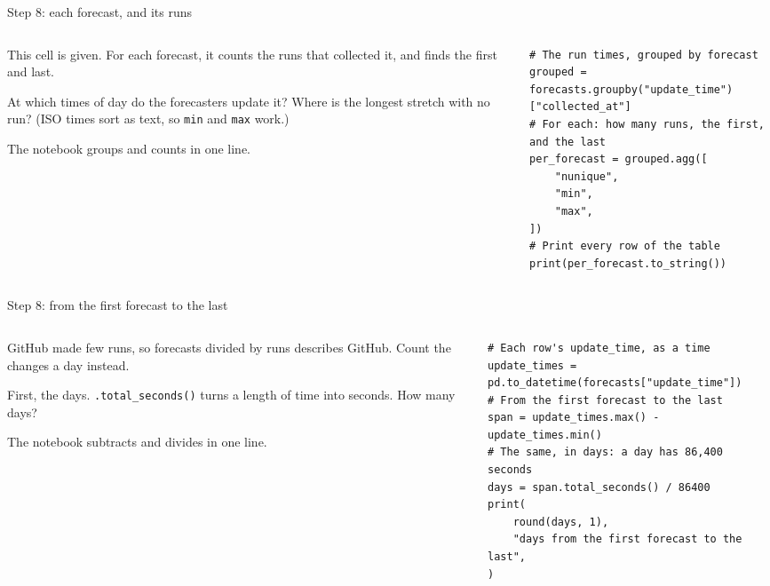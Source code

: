 \documentclass[9pt,aspectratio=169]{beamer}
\begin{document}
\begin{frame}[fragile]{Step 8: each forecast, and its runs}
    \begin{columns}[T]
        \begin{column}{0.37\textwidth}
            This cell is given. For each forecast, it counts the runs that collected it, and finds the first and last.

            \medskip
            At which times of day do the forecasters update it? Where is the longest stretch with no run? (ISO times sort as text, so \texttt{min} and \texttt{max} work.)

            \medskip
            The notebook groups and counts in one line.
        \end{column}
        \begin{column}{0.6\textwidth}
\begin{lstlisting}
# The run times, grouped by forecast
grouped = forecasts.groupby("update_time")["collected_at"]
# For each: how many runs, the first, and the last
per_forecast = grouped.agg([
    "nunique",
    "min",
    "max",
])
# Print every row of the table
print(per_forecast.to_string())
\end{lstlisting}
        \end{column}
    \end{columns}
\end{frame}

\begin{frame}[fragile]{Step 8: from the first forecast to the last}
    \begin{columns}[T]
        \begin{column}{0.37\textwidth}
            GitHub made few runs, so forecasts divided by runs describes GitHub. Count the changes a day instead.

            \medskip
            First, the days. \texttt{.total\_seconds()} turns a length of time into seconds. How many days?

            \medskip
            The notebook subtracts and divides in one line.
        \end{column}
        \begin{column}{0.6\textwidth}
\begin{lstlisting}
# Each row's update_time, as a time
update_times = pd.to_datetime(forecasts["update_time"])
# From the first forecast to the last
span = update_times.max() - update_times.min()
# The same, in days: a day has 86,400 seconds
days = span.total_seconds() / 86400
print(
    round(days, 1),
    "days from the first forecast to the last",
)
\end{lstlisting}
        \end{column}
    \end{columns}
\end{frame}
\end{document}
